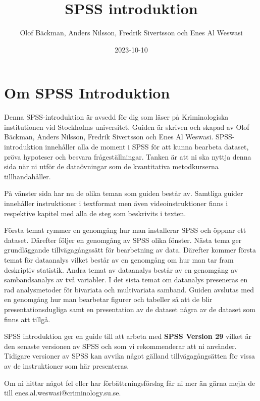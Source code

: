 \documentclass[
]{book}
\title{SPSS introduktion}
\author{Olof Bäckman, Anders Nilsson, Fredrik Sivertsson och Enes Al Weswasi}
\date{2023-10-10}
\begin{document}
\maketitle

{
\hypersetup{linkcolor=}
\setcounter{tocdepth}{1}
\tableofcontents
}
\hypertarget{om-spss-introduktion}{%
\chapter*{Om SPSS Introduktion}\label{om-spss-introduktion}}

Denna SPSS-introduktion är avsedd för dig som läser på Kriminologiska institutionen vid Stockholms universitet. Guiden är skriven och skapad av Olof Bäckman, Anders Nilsson, Fredrik Sivertsson och Enes Al Weswasi. SPSS-introduktion innehåller alla de moment i SPSS för att kunna bearbeta dataset, pröva hypoteser och besvara frågeställningar. Tanken är att ni ska nyttja denna sida när ni utför de dataövningar som de kvantitativa metodkurserna tillhandahåller.

På vänster sida har nu de olika teman som guiden består av. Samtliga guider innehåller instruktioner i textformat men även videoinstruktioner finns i respektive kapitel med alla de steg som beskrivits i texten.

Första temat rymmer en genomgång hur man installerar SPSS och öppnar ett dataset. Därefter följer en genomgång av SPSS olika fönster. Nästa tema ger grundläggande tillvägagångssätt för bearbetning av data. Därefter kommer första temat för dataanalys vilket består av en genomgång om hur man tar fram deskriptiv statistik. Andra temat av dataanalys består av en genomgång av sambandsanalys av två variabler. I det sista temat om datanalys preseneras en rad analysmetoder för bivariata och multivariata samband. Guiden avslutas med en genomgång hur man bearbetar figurer och tabeller så att de blir presentationsdugliga samt en presentation av de dataset några av de dataset som finns att tillgå.

SPSS introduktion ger en guide till att arbeta med \textbf{SPSS Version 29} vilket är den senaste versionen av SPSS och som vi rekommenderar att ni använder. Tidigare versioner av SPSS kan avvika något gälland tillvägagångsätten för vissa av de instruktioner som här presenteras.

Om ni hittar något fel eller har förbättrningsförslag får ni mer än gärna mejla de till enes.al.weswasi@criminology.su.se.
\end{document}
